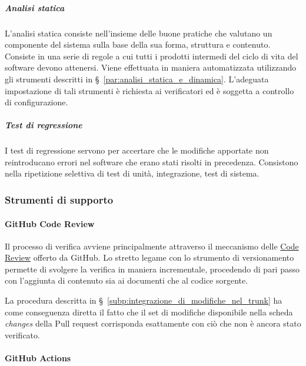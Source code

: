 \documentclass[../../norme-di-progetto.tex]{subfiles}
\begin{document}

\subparagraph{Analisi statica}%
\label{subp:verifica/analisi_statica}

L'analisi statica consiste nell'insieme delle buone pratiche che valutano un componente del sistema sulla base della sua forma, struttura e contenuto.
Consiste in una serie di regole a cui tutti i prodotti intermedi del ciclo di vita del software devono attenersi.
Viene effettuata in maniera automatizzata utilizzando gli strumenti descritti in §~\ref{par:analisi_statica_e_dinamica}. L'adeguata impostazione di tali strumenti è richiesta ai verificatori ed è soggetta a controllo di configurazione.

\subparagraph{Test di regressione}%
\label{test_di_regressione}

I test di regressione servono per accertare che le modifiche apportate non reintroducano errori nel software che erano stati risolti in precedenza.
Consistono nella ripetizione selettiva di test di unità, integrazione, test di sistema.


\subsubsection{Strumenti di supporto}%
\label{subs:verifica/strumenti}

\paragraph{GitHub Code Review}%
\label{par:code_review}

Il processo di verifica avviene principalmente attraverso il meccanismo delle \href{https://github.com/features/code-review/}{Code Review} offerto da GitHub.
Lo stretto legame con lo strumento di versionamento permette di svolgere la verifica in maniera incrementale, procedendo di pari passo con l'aggiunta di contenuto sia ai documenti che al codice sorgente.

La procedura descritta in §~\ref{subp:integrazione_di_modifiche_nel_trunk} ha come conseguenza diretta il fatto che il set di modifiche disponibile nella scheda \textit{changes} della Pull request corrisponda esattamente con ciò che non è ancora stato verificato.


\paragraph{GitHub Actions}%
\label{par:github_actions}
\end{document}

